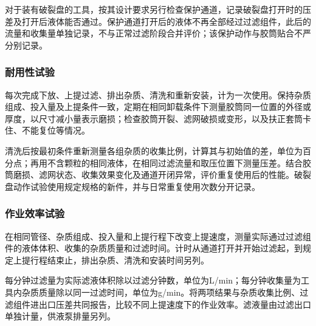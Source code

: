 对于装有破裂盘的工具，按其设计要求另行检查保护通道，记录破裂盘打开时的压差及打开后液体能否通过。保护通道打开后的液体不再全部经过过滤组件，此后的流量和收集量单独记录，不与正常过滤阶段合并评价；该保护动作与胶筒贴合不严分别记录。

\subsubsection{耐用性试验}
每次完成下放、上提过滤、排出杂质、清洗和重新安装，计为一次使用。保持杂质组成、投入量及上提条件一致，定期在相同卸载条件下测量胶筒同一位置的外径或厚度，以尺寸减小量表示磨损；检查胶筒开裂、滤网破损或变形，以及扶正套筒卡住、不能复位等情况。

清洗后按最初条件重新测量各组杂质的收集比例，计算其与初始值的差，单位为百分点；再用不含颗粒的相同液体，在相同过滤流量和取压位置下测量压差。结合胶筒磨损、滤网状态、收集效果变化及通道开闭异常，评价重复使用后的性能。破裂盘动作试验使用规定规格的新件，并与日常重复使用次数分开记录。

\subsubsection{作业效率试验}
在相同管径、杂质组成、投入量和上提行程下改变上提速度，测量实际通过过滤组件的液体体积、收集的杂质质量和过滤时间。计时从通道打开并开始过滤起，到规定上提行程结束止，排出杂质、清洗和安装时间另列。

每分钟过滤量为实际滤液体积除以过滤分钟数，单位为L/min；每分钟收集量为工具内杂质质量除以同一过滤时间，单位为g/min。将两项结果与杂质收集比例、过滤组件进出口压差共同报告，比较不同上提速度下的作业效率。滤液量由过滤出口单独计量，供液泵排量另列。

